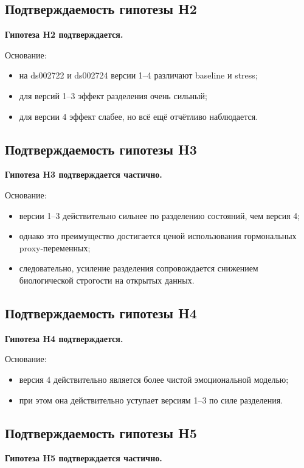 \documentclass[12pt,a4paper]{article}
\begin{document}
\subsection{Подтверждаемость гипотезы H2}
\textbf{Гипотеза H2 подтверждается.}

Основание:
\begin{itemize}[leftmargin=1.25cm]
    \item на ds002722 и ds002724 версии 1--4 различают baseline и stress;
    \item для версий 1--3 эффект разделения очень сильный;
    \item для версии 4 эффект слабее, но всё ещё отчётливо наблюдается.
\end{itemize}

\subsection{Подтверждаемость гипотезы H3}
\textbf{Гипотеза H3 подтверждается частично.}

Основание:
\begin{itemize}[leftmargin=1.25cm]
    \item версии 1--3 действительно сильнее по разделению состояний, чем версия 4;
    \item однако это преимущество достигается ценой использования гормональных proxy-переменных;
    \item следовательно, усиление разделения сопровождается снижением биологической строгости на открытых данных.
\end{itemize}

\subsection{Подтверждаемость гипотезы H4}
\textbf{Гипотеза H4 подтверждается.}

Основание:
\begin{itemize}[leftmargin=1.25cm]
    \item версия 4 действительно является более чистой эмоциональной моделью;
    \item при этом она действительно уступает версиям 1--3 по силе разделения.
\end{itemize}

\subsection{Подтверждаемость гипотезы H5}
\textbf{Гипотеза H5 подтверждается частично.}
\end{document}
